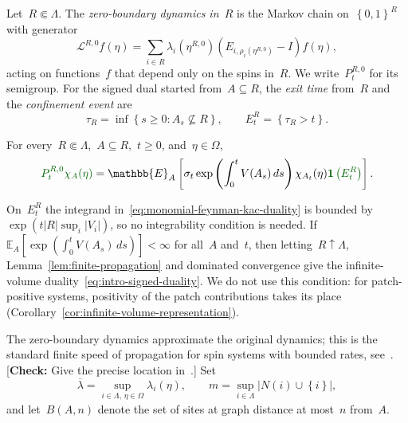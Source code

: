 \documentclass[EJP,preprint,NODS,nobera]{ejpecp}
\newcommand{\E}{\mathbb{E}}
\newcommand{\bb}[1]{\left(#1\right)}
\newcommand{\Cb}[1]{\left[#1\right]}
\newcommand{\cb}[1]{\left\{#1\right\}}
\newcommand{\abs}[1]{\left|#1\right|}
\newcommand{\ind}{\mathbf{1}}
\newcommand{\Lcal}{\mathcal{L}}
\newcommand{\chg}[1]{{\color{changegreen}#1}}
\newcommand{\authorcheck}[1]{{\color{blue}[\textbf{Check:} #1]}}
\begin{document}
\chg{\begin{definition}
\label{def:finite-volume}
Let~$R\Subset\Lambda$. The \emph{zero-boundary dynamics in~$R$} is the
Markov chain on~$\cb{0,1}^R$ with generator
\begin{equation}
\label{eq:zero-boundary-generator}
\Lcal^{R,0}f(\eta)
=
\sum_{i\in R}
\lambda_i\bb{\eta^{R,0}}
\bb{E_{i,\rho_i(\eta^{R,0})}-I}f(\eta),
\end{equation}
acting on functions~$f$ that depend only on the spins in~$R$. We write~$P_t^{R,0}$
for its semigroup. For the signed dual started from~$A\subseteq R$, the
\emph{exit time} from~$R$ and the \emph{confinement event} are
\begin{equation}
\label{eq:confinement-event}
\tau_R=\inf\cb{s\geq0:A_s\nsubseteq R},
\qquad
E_t^R=\cb{\tau_R>t}.
\end{equation}
\end{definition}}

\begin{proposition}
\label{thm:monomial-duality}
\chg{For every~$R\Subset\Lambda$,~$A\subseteq R$,~$t\geq0$, and~$\eta\in\Omega$,}
\begin{equation}
\label{eq:monomial-feynman-kac-duality}
\chg{P_t^{R,0}\chi_A(\eta)}
=
\E_A\Cb{
\sigma_t
\exp\bb{\int_0^t V(A_s)\,ds}
\chi_{A_t}(\eta)
\chg{\ind\bb{E_t^R}}
}.
\end{equation}
\end{proposition}

\chg{\begin{remark}
\label{rem:fk-infinite-volume}
On~$E_t^R$ the integrand in~\eqref{eq:monomial-feynman-kac-duality} is bounded
by~$\exp\bb{t\abs R\sup_i\abs{V_i}}$, so no integrability condition is needed.
If~$\E_A\Cb{\exp\bb{\int_0^tV(A_s)\,ds}}<\infty$ for all~$A$ and~$t$, then
letting~$R\uparrow\Lambda$, Lemma~\ref{lem:finite-propagation} and dominated
convergence give the infinite-volume duality~\eqref{eq:intro-signed-duality}.
We do not use this condition: for patch-positive systems, positivity of the
patch contributions takes its place
(Corollary~\ref{cor:infinite-volume-representation}).
\end{remark}}

\chg{The zero-boundary dynamics approximate the original dynamics; this is the
standard finite speed of propagation for spin systems with bounded rates,
see~\cite[Chapter~I]{Liggett1985}.}
\authorcheck{Give the precise location in~\cite{Liggett1985}.}
\chg{Set}
\begin{equation*}
\overline\lambda
=
\sup_{i\in\Lambda,\,\eta\in\Omega}\lambda_i(\eta),
\qquad
m
=
\sup_{i\in\Lambda}\abs{N(i)\cup\cb{i}},
\end{equation*}
\chg{and let~$B(A,n)$ denote the set of sites at graph distance at most~$n$
from~$A$.}
\end{document}
